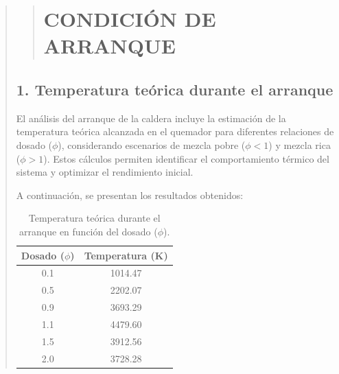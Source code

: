 \documentclass[11pt, a4paper]{article}
\begin{document}
\begin{quote}
\begin{center}
\begin{adjustwidth}{-1.7cm}{-1cm}
\newpage



\begin{quote}
\setlength{\parskip}{1pt} %
\vspace*{0.3cm} %
\hypertarget{arranque}{%
\section{CONDICIÓN DE ARRANQUE}\label{arranque}}
\end{quote}
\vspace*{1cm} %


\subsection*{1. Temperatura teórica durante el arranque}

El análisis del arranque de la caldera incluye la estimación de la temperatura teórica alcanzada en el quemador para diferentes relaciones de dosado (\(\phi\)), considerando escenarios de mezcla pobre (\(\phi < 1\)) y mezcla rica (\(\phi > 1\)). Estos cálculos permiten identificar el comportamiento térmico del sistema y optimizar el rendimiento inicial.

A continuación, se presentan los resultados obtenidos:

\begin{table}[h!]
\centering
\begin{tabular}{|c|c|}
\hline
\textbf{Dosado (\(\phi\))} & \textbf{Temperatura (K)} \\ \hline
0.1                        & 1014.47                 \\ \hline
0.5                        & 2202.07                 \\ \hline
0.9                        & 3693.29                 \\ \hline
1.1                        & 4479.60                 \\ \hline
1.5                        & 3912.56                 \\ \hline
2.0                        & 3728.28                 \\ \hline
\end{tabular}
\caption{Temperatura teórica durante el arranque en función del dosado (\(\phi\)).}
\label{tab:temperatura_dosado}
\end{table}


\end{adjustwidth}
\end{center}
\end{quote}
\end{document}
